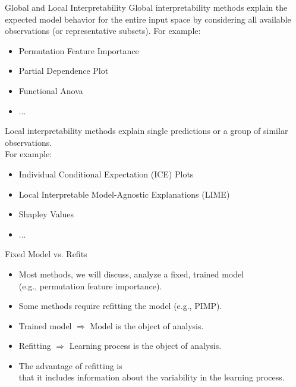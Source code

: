 \documentclass[aspectratio=169]{../latex_main/tntbeamer}  %
\begin{document}
\begin{frame}[c]{Global and Local Interpretability}
	Global interpretability methods explain the expected model behavior for the entire input space by considering all available observations (or representative subsets). For example:
	\begin{itemize}
		\item Permutation Feature Importance
		\item Partial Dependence Plot
		\item Functional Anova
		\item ...
	\end{itemize}
	Local interpretability methods explain single predictions or a group of similar observations.\\ For example:
	\begin{itemize}
		\item Individual Conditional Expectation (ICE) Plots
		\item Local Interpretable Model-Agnostic Explanations (LIME)
		\item Shapley Values
		\item ...
	\end{itemize}
\end{frame}


\begin{frame}[c]{Fixed Model vs. Refits}
	\begin{itemize}
		\itemsep1em
		\item Most methods, we will discuss, analyze a fixed, trained model\\ 
		(e.g., permutation feature importance).
		\item Some methods require refitting the model (e.g., PIMP).
		\item Trained model $\Rightarrow$ Model is the object of analysis.
		\item Refitting $\Rightarrow$ Learning process is the object of analysis.
		\item The advantage of refitting is\\ that it includes information about the variability in the learning process.
	\end{itemize}
\end{frame}

	
\end{document}
